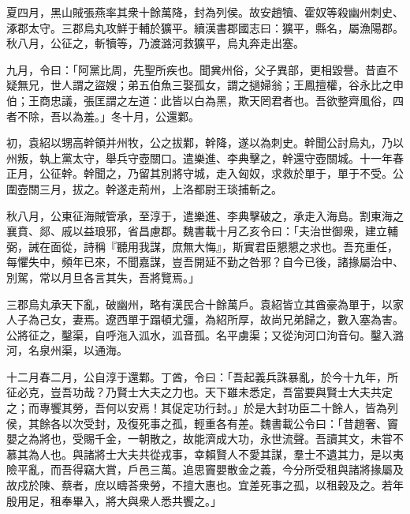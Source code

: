 \begin{pinyinscope}
夏四月，黑山賊張燕率其衆十餘萬降，封為列侯。故安趙犢、霍奴等殺幽州刺史、涿郡太守。三郡烏丸攻鮮于輔於獷平。續漢書郡國志曰：獷平，縣名，屬漁陽郡。秋八月，公征之，斬犢等，乃渡潞河救獷平，烏丸奔走出塞。

九月，令曰：「阿黨比周，先聖所疾也。聞兾州俗，父子異部，更相毀譽。昔直不疑無兄，世人謂之盜嫂；弟五伯魚三娶孤女，謂之撾婦翁；王鳳擅權，谷永比之申伯；王商忠議，張匡謂之左道：此皆以白為黑，欺天罔君者也。吾欲整齊風俗，四者不除，吾以為羞。」冬十月，公還鄴。

初，袁紹以甥高幹領并州牧，公之拔鄴，幹降，遂以為刺史。幹聞公討烏丸，乃以州叛，執上黨太守，舉兵守壺關口。遣樂進、李典擊之，幹還守壺關城。十一年春正月，公征幹。幹聞之，乃留其別將守城，走入匈奴，求救於單于，單于不受。公圍壺關三月，拔之。幹遂走荊州，上洛都尉王琰捕斬之。

秋八月，公東征海賊管承，至淳于，遣樂進、李典擊破之，承走入海島。割東海之襄賁、郯、戚以益琅邪，省昌慮郡。魏書載十月乙亥令曰：「夫治世御衆，建立輔弼，誡在面從，詩稱『聽用我謀，庶無大悔』，斯實君臣懇懇之求也。吾充重任，每懼失中，頻年已來，不聞嘉謀，豈吾開延不勤之咎邪？自今已後，諸掾屬治中、別駕，常以月旦各言其失，吾將覽焉。」

三郡烏丸承天下亂，破幽州，略有漢民合十餘萬戶。袁紹皆立其酋豪為單于，以家人子為己女，妻焉。遼西單于蹋頓尤彊，為紹所厚，故尚兄弟歸之，數入塞為害。公將征之，鑿渠，自呼沲入泒水，泒音孤。名平虜渠；又從泃河口泃音句。鑿入潞河，名泉州渠，以通海。

十二月春二月，公自淳于還鄴。丁酋，令曰：「吾起義兵誅暴亂，於今十九年，所征必克，豈吾功哉？乃賢士大夫之力也。天下雖未悉定，吾當要與賢士大夫共定之；而專饗其勞，吾何以安焉！其促定功行封。」於是大封功臣二十餘人，皆為列侯，其餘各以次受封，及復死事之孤，輕重各有差。魏書載公令曰：「昔趙奢、竇嬰之為將也，受賜千金，一朝散之，故能濟成大功，永世流聲。吾讀其文，未甞不慕其為人也。與諸將士大夫共從戎事，幸賴賢人不愛其謀，羣士不遺其力，是以夷險平亂，而吾得竊大賞，戶邑三萬。追思竇嬰散金之義，今分所受租與諸將掾屬及故戍於陳、蔡者，庶以疇荅衆勞，不擅大惠也。宜差死事之孤，以租穀及之。若年殷用足，租奉畢入，將大與衆人悉共饗之。」


\end{pinyinscope}
